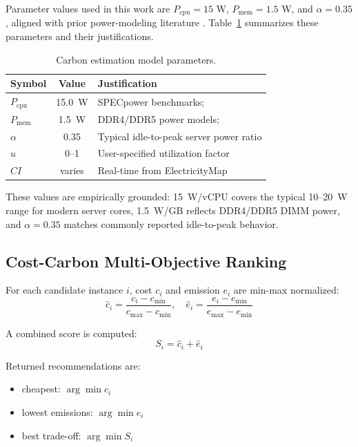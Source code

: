 \documentclass[12pt]{article}
\begin{document}
Parameter values used in this work are $P_{\text{cpu}}=15$ W, $P_{\text{mem}}=1.5$ W, and $\alpha=0.35$, aligned with prior power-modeling literature \citep{b10,b11}. Table~\ref{tab:params} summarizes these parameters and their justifications.

\begin{table}[!t]
\centering
\caption{Carbon estimation model parameters.}
\label{tab:params}
\small
\begin{tabular}{lcl}
\toprule
\textbf{Symbol} & \textbf{Value} & \textbf{Justification} \\
\midrule
$P_{\text{cpu}}$ & 15.0~W & SPECpower benchmarks; \citet{b10} \\
$P_{\text{mem}}$ & 1.5~W  & DDR4/DDR5 power models; \citet{b11} \\
$\alpha$          & 0.35   & Typical idle-to-peak server power ratio \\
$u$               & 0--1   & User-specified utilization factor \\
$CI$              & varies & Real-time from ElectricityMap \citep{b9} \\
\bottomrule
\end{tabular}
\end{table}

These values are empirically grounded: 15~W/vCPU covers the typical 10--20~W range for modern server cores, 1.5~W/GB reflects DDR4/DDR5 DIMM power, and $\alpha=0.35$ matches commonly reported idle-to-peak behavior.

\subsection{Cost-Carbon Multi-Objective Ranking}
For each candidate instance $i$, cost $c_i$ and emission $e_i$ are min-max normalized:
\begin{equation}
\hat{c}_i = \frac{c_i-c_{\min}}{c_{\max}-c_{\min}}, \quad
\hat{e}_i = \frac{e_i-e_{\min}}{e_{\max}-e_{\min}}
\end{equation}

A combined score is computed:
\begin{equation}
S_i = \hat{c}_i + \hat{e}_i
\end{equation}

Returned recommendations are:
\begin{itemize}
    \item cheapest: $\arg\min c_i$
    \item lowest emissions: $\arg\min e_i$
    \item best trade-off: $\arg\min S_i$
\end{itemize}
\end{document}
